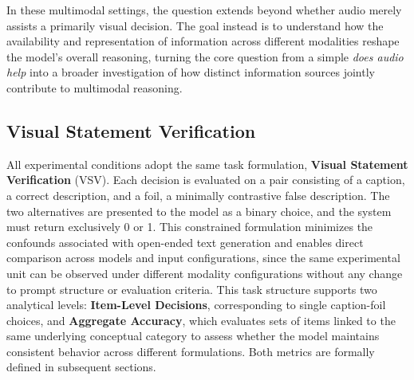 In these multimodal settings, the question extends beyond whether audio merely assists a primarily visual decision. The goal instead is to understand how the availability and representation of information across different modalities reshape the model's overall reasoning, turning the core question from a simple \textit{does audio help} into a broader investigation of how distinct information sources jointly contribute to multimodal reasoning.
\subsection*{Visual Statement Verification}
All experimental conditions adopt the same task formulation, \textbf{Visual Statement Verification} (VSV). Each decision is evaluated on a pair consisting of a caption, a correct description, and a foil, a minimally contrastive false description. The two alternatives are presented to the model as a binary choice, and the system must return exclusively 0 or 1. This constrained formulation minimizes the confounds associated with open-ended text generation and enables direct comparison across models and input configurations, since the same experimental unit can be observed under different modality configurations without any change to prompt structure or evaluation criteria.
This task structure supports two analytical levels: \textbf{Item-Level Decisions}, corresponding to single caption-foil choices, and \textbf{Aggregate Accuracy}, which evaluates sets of items linked to the same underlying conceptual category to assess whether the model maintains consistent behavior across different formulations. Both metrics are formally defined in subsequent sections.

